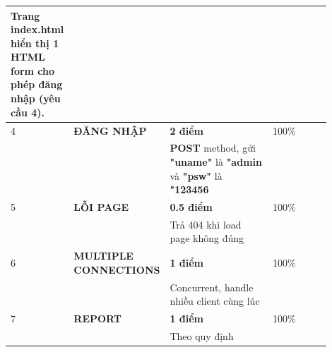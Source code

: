 \documentclass[14pt, a4paper]{extarticle}
\begin{document}
\begin{table}[h!]
\begin{tabular}{| p{0.05\linewidth}| p{0.3\linewidth}| p{0.35\linewidth}| p{0.20\linewidth}|}
        Trang index.html hiển thị 1 HTML form cho phép đăng nhập (yêu cầu 4). &                                                                                                                                                                      \\
        \hline
        4                                                                     & \textbf{ĐĂNG NHẬP}                & \textbf{2 điểm}                                                                                     & 100\%                      \\
                                                                              &                                   & \textbf{POST} method, gửi \textbf{"uname"} là \textbf{"admin} và \textbf{"psw"} là \textbf{"123456} &                            \\
        \hline
        5                                                                     & \textbf{LỖI PAGE}                 & \textbf{0.5 điểm}                                                                                   & 100\%                      \\
                                                                              &                                   & Trả 404 khi load page không đúng                                                                    &                            \\
        \hline
        6                                                                     & \textbf{MULTIPLE CONNECTIONS}     & \textbf{1 điểm}                                                                                     & 100\%                      \\
                                                                              &                                   & Concurrent, handle nhiều client cùng lúc                                                            &                            \\
        \hline
        7                                                                     & \textbf{REPORT}                   & \textbf{1 điểm}                                                                                     & 100\%                      \\
                                                                              &                                   & Theo quy định                                                                                       &                            \\
        \hline
    \end{tabular}
\end{table}
\end{document}
